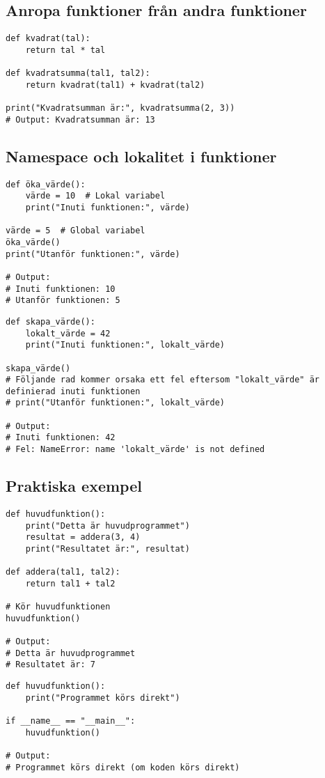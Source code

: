 \subsection*{Anropa funktioner från andra funktioner}

\begin{lstlisting}[title=Exempel 6: Funktion som använder en annan funktion]
def kvadrat(tal):
    return tal * tal

def kvadratsumma(tal1, tal2):
    return kvadrat(tal1) + kvadrat(tal2)

print("Kvadratsumman är:", kvadratsumma(2, 3))
# Output: Kvadratsumman är: 13
\end{lstlisting}

\subsection*{Namespace och lokalitet i funktioner}

\begin{lstlisting}[title=Exempel 7: Lokala och globala variabler]
def öka_värde():
    värde = 10  # Lokal variabel
    print("Inuti funktionen:", värde)

värde = 5  # Global variabel
öka_värde()
print("Utanför funktionen:", värde)

# Output:
# Inuti funktionen: 10
# Utanför funktionen: 5
\end{lstlisting}

\begin{lstlisting}[title=Exempel 8: Problem med att använda lokala variabler utanför funktioner]
def skapa_värde():
    lokalt_värde = 42
    print("Inuti funktionen:", lokalt_värde)

skapa_värde()
# Följande rad kommer orsaka ett fel eftersom "lokalt_värde" är definierad inuti funktionen
# print("Utanför funktionen:", lokalt_värde)

# Output:
# Inuti funktionen: 42
# Fel: NameError: name 'lokalt_värde' is not defined
\end{lstlisting}

\subsection*{Praktiska exempel}

\begin{lstlisting}[title=Exempel 9: Huvudfunktion i ett program]
def huvudfunktion():
    print("Detta är huvudprogrammet")
    resultat = addera(3, 4)
    print("Resultatet är:", resultat)

def addera(tal1, tal2):
    return tal1 + tal2

# Kör huvudfunktionen
huvudfunktion()

# Output:
# Detta är huvudprogrammet
# Resultatet är: 7
\end{lstlisting}

\begin{lstlisting}[title=Exempel 10: Kontrollera om program körs direkt]
def huvudfunktion():
    print("Programmet körs direkt")

if __name__ == "__main__":
    huvudfunktion()

# Output:
# Programmet körs direkt (om koden körs direkt)
\end{lstlisting}
